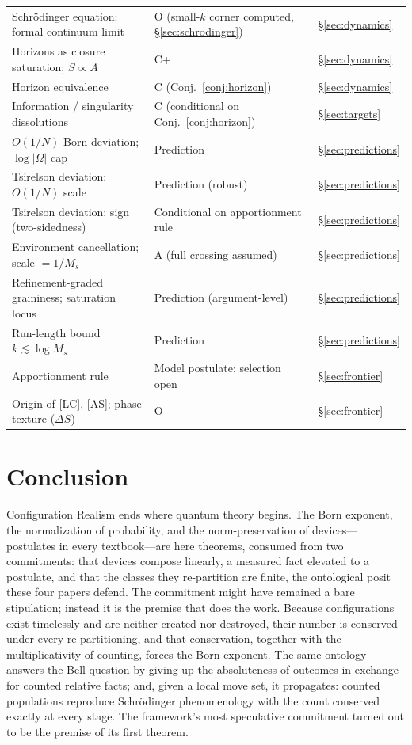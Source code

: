 \documentclass[11pt]{article}
\theoremstyle{definition}
\theoremstyle{remark}
\begin{document}
{\begin{longtable}{@{}lll@{}}
Schr\"odinger equation: formal continuum limit & O (small-$k$ corner computed, \S\ref{sec:schrodinger}) & \S\ref{sec:dynamics}\\
Horizons as closure saturation; $S \propto A$ & C+ & \S\ref{sec:dynamics}\\
Horizon equivalence & C (Conj.~\ref{conj:horizon}) & \S\ref{sec:dynamics}\\
Information / singularity dissolutions & C (conditional on Conj.~\ref{conj:horizon}) & \S\ref{sec:targets}\\
$O(1/N)$ Born deviation; $\log|\Omega|$ cap & Prediction & \S\ref{sec:predictions}\\
Tsirelson deviation: $O(1/N)$ scale & Prediction (robust) & \S\ref{sec:predictions}\\
Tsirelson deviation: sign (two-sidedness) & Conditional on apportionment rule & \S\ref{sec:predictions}\\
Environment cancellation; scale $= 1/M_s$ & A (full crossing assumed) & \S\ref{sec:predictions}\\
Refinement-graded graininess; saturation locus & Prediction (argument-level) & \S\ref{sec:predictions}\\
Run-length bound $k \lesssim \log M_s$ & Prediction & \S\ref{sec:predictions}\\
Apportionment rule & Model postulate; selection open & \S\ref{sec:frontier}\\
Origin of [LC], [AS]; phase texture ($\Delta S$) & O & \S\ref{sec:frontier}\\
\end{longtable}
}

\section{Conclusion}\label{sec:conclusion}
Configuration Realism ends where quantum theory begins. The Born exponent, the normalization of probability, and the norm-preservation of devices---postulates in every textbook---are here theorems, consumed from two commitments: that devices compose linearly, a measured fact elevated to a postulate, and that the classes they re-partition are finite, the ontological posit these four papers defend. The commitment might have remained a bare stipulation; instead it is the premise that does the work. Because configurations exist timelessly and are neither created nor destroyed, their number is conserved under every re-partitioning, and that conservation, together with the multiplicativity of counting, forces the Born exponent. The same ontology answers the Bell question by giving up the absoluteness of outcomes in exchange for counted relative facts; and, given a local move set, it propagates: counted populations reproduce Schr\"odinger phenomenology with the count conserved exactly at every stage. The framework's most speculative commitment turned out to be the premise of its first theorem.
\end{document}
